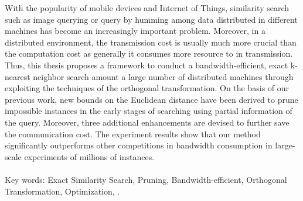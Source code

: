 \begin{abstractEN}

With the popularity of mobile devices and Internet of Things, similarity search such as image querying or query by humming among data distributed in different machines has become an increasingly important problem.  Moreover, in a distributed environment, the transmission cost is usually much more crucial than the computation cost as generally it consumes more resource to in transmission.  Thus, this thesis proposes a framework to conduct a bandwidth-efficient, exact k-nearest neighbor search amount a large number of distributed machines through exploiting the techniques of the orthogonal transformation.  On the basis of our previous work, new bounds on the Euclidean distance have been derived to prune impossible instances in the early stages of searching using partial information of the query.  Moreover, three additional enhancements are devised to further save the communication cost.  The experiment results show that our method significantly outperforms other competitions in bandwidth consumption in large-scale experiments of millions of instances.
\\ \\
Key words: Exact Similarity Search, Pruning, Bandwidth-efficient, Orthogonal Transformation, Optimization, .

\end{abstractEN}
